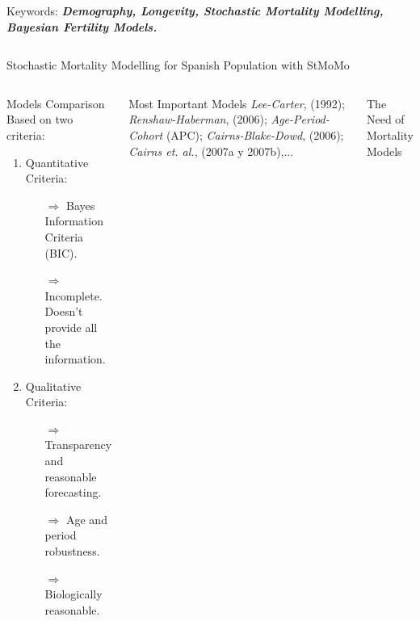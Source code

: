 \documentclass[]{beamer}
\begin{document}
\begin{frame}{\vspace{1ex}\hfill Keywords: \bfseries \textit{Demography, Longevity, Stochastic Mortality Modelling, Bayesian Fertility Models.}}
\begin{columns}[t]
\begin{block}{Stochastic Mortality Modelling for Spanish Population with StMoMo}
			\begin{columns}[t]
				\begin{block}{Models Comparison}
				\setlength{\parindent}{1.2em}
				\setlength{\parskip}{1ex}\vspace{-0.75cm}
					\noindent Based on two criteria:\vspace{-0.3cm} 
					\begin{enumerate}
						\item Quantitative Criteria:
						\begin{enumerate}
							\item[$\Rightarrow$] Bayes Information Criteria (BIC).
							\item[$\Rightarrow$] Incomplete. Doesn't provide all the information.
						\end{enumerate}
						\item Qualitative Criteria:
						\begin{enumerate}
							\item[$\Rightarrow$] Transparency and reasonable forecasting.
							\item[$\Rightarrow$] Age and period robustness.
							\item[$\Rightarrow$] Biologically reasonable.				
						\end{enumerate}
					\end{enumerate}
				\end{block}\vspace{-1cm}
				\begin{block}{Most Important Models}\vspace{-0.5cm}
				\textit{Lee-Carter}, (1992); \textit{Renshaw-Haberman}, (2006); \textit{Age-Period-Cohort} (APC); \textit{Cairns-Blake-Dowd}, (2006); \textit{Cairns et. al.}, (2007a y 2007b),...
				\end{block}
				\begin{block}{The Need of Mortality Models}\vspace{-0.5cm} 
					\begin{itemize}

\end{itemize}
\end{block}
\end{columns}
\end{block}
\end{columns}
\end{frame}
\end{document}
